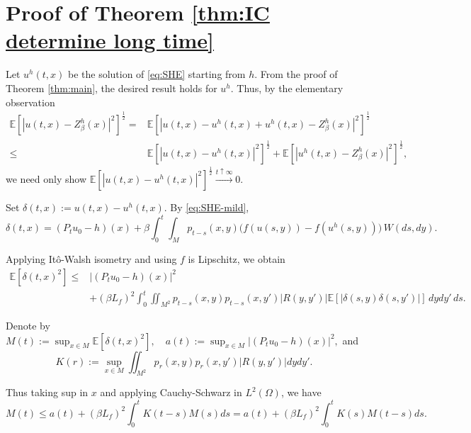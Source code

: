 \documentclass{article}
\numberwithin{theorem}{section}
\def\EE{\mathbb{E}} %
\begin{document}
\section{Proof of Theorem \ref{thm:IC determine long time}}\label{sec:long time}

Let $u^h(t,x)$ be the solution of \eqref{eq:SHE} starting from $h$. From the proof of Theorem \ref{thm:main}, the desired result holds for $u^h$. Thus, by the elementary observation \begin{align*}\EE[|u(t,x)-Z^h_\beta(x)|^2]^{\frac{1}{2}}=&\EE[|u(t,x)-u^h(t,x)+u^h(t,x)-Z^h_\beta(x)|^2]^{\frac{1}{2}}\\
\leq& \EE[|u(t,x)-u^h(t,x)|^2]^{\frac{1}{2}}+\EE[|u^h(t,x)-Z^h_\beta(x)|^2]^{\frac{1}{2}},
\end{align*}
we need only show \(\EE[|u(t,x)-u^h(t,x)|^2]^{\frac{1}{2}}\stackrel{t\uparrow\infty}{\longrightarrow}0.\)

Set $\delta(t,x) := u(t,x) - u^h(t,x)$. By \eqref{eq:SHE-mild},
\[
\delta(t,x)
=
(P_tu_0 - h)(x)
+
\beta \int_0^t \int_M p_{t-s}(x,y)\big(f(u(s,y)) - f(u^h(s,y))\big)\,W(ds,dy).
\]

Applying It\^o-Walsh isometry and using $f$ is Lipschitz, we obtain
\begin{align*}
    \EE[\delta(t,x)^2]\le&|(P_tu_0 - h)(x)|^2\\
    &+(\beta L_f)^2 \int_0^t \iint_{M^2} p_{t-s}(x,y)p_{t-s}(x,y') |R(y,y')| \EE[|\delta(s,y)\delta(s,y')|]\,dydy'\,ds.
\end{align*}

Denote by \(
M(t):=\sup_{x\in M} \EE[\delta(t,x)^2],\quad a(t):=\sup_{x\in M} |(P_tu_0 - h)(x)|^2,\) and \[K(r):=\sup_{x\in M}\iint_{M^2}p_r(x,y)p_r(x,y')|R(y,y')|dydy'.\]

Thus taking sup in $x$ and applying Cauchy-Schwarz in $L^2(\Omega)$, we have \begin{equation}\label{est:M(t)}
    M(t)\leq a(t)+(\beta L_f)^2\int_0^t K(t-s)M(s)ds=a(t)+(\beta L_f)^2\int_0^t K(s)M(t-s)ds.
\end{equation}
\end{document}

